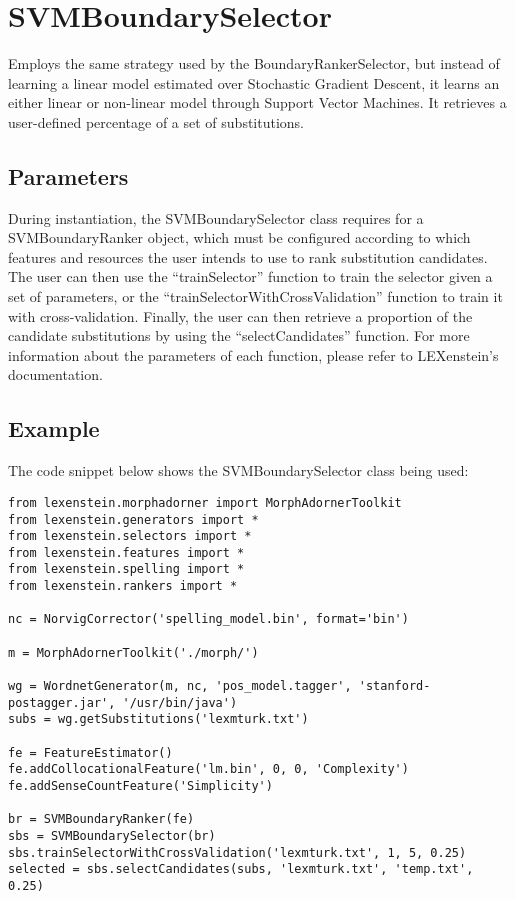 \section{SVMBoundarySelector}

Employs the same strategy used by the BoundaryRankerSelector, but instead of learning a linear model estimated over Stochastic Gradient Descent, it learns an either linear or non-linear model through Support Vector Machines. It retrieves a user-defined percentage of a set of substitutions.

\subsection{Parameters}

During instantiation, the SVMBoundarySelector class requires for a SVMBoundaryRanker object, which must be configured according to which features and resources the user intends to use to rank substitution candidates. The user can then use the ``trainSelector'' function to train the selector given a set of parameters, or the ``trainSelectorWithCrossValidation'' function to train it with cross-validation. Finally, the user can then retrieve a proportion of the candidate substitutions by using the ``selectCandidates'' function. For more information about the parameters of each function, please refer to LEXenstein's documentation.

\subsection{Example}

The code snippet below shows the SVMBoundarySelector class being used:

\begin{lstlisting}
from lexenstein.morphadorner import MorphAdornerToolkit
from lexenstein.generators import *
from lexenstein.selectors import *
from lexenstein.features import *
from lexenstein.spelling import *
from lexenstein.rankers import *

nc = NorvigCorrector('spelling_model.bin', format='bin')

m = MorphAdornerToolkit('./morph/')

wg = WordnetGenerator(m, nc, 'pos_model.tagger', 'stanford-postagger.jar', '/usr/bin/java')
subs = wg.getSubstitutions('lexmturk.txt')

fe = FeatureEstimator()
fe.addCollocationalFeature('lm.bin', 0, 0, 'Complexity')
fe.addSenseCountFeature('Simplicity')

br = SVMBoundaryRanker(fe)
sbs = SVMBoundarySelector(br)
sbs.trainSelectorWithCrossValidation('lexmturk.txt', 1, 5, 0.25)
selected = sbs.selectCandidates(subs, 'lexmturk.txt', 'temp.txt', 0.25)
\end{lstlisting}










